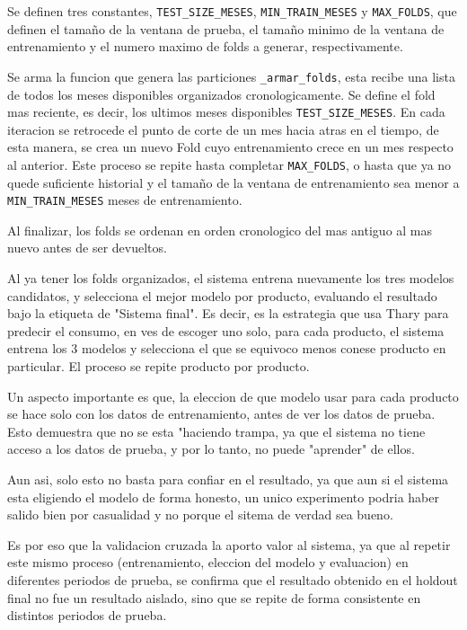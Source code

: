 Se definen tres constantes, \texttt{TEST\_SIZE\_MESES}, \texttt{MIN\_TRAIN\_MESES} y \texttt{MAX\_FOLDS}, que definen el tamaño de la ventana de prueba, el tamaño minimo de la ventana de entrenamiento y el numero maximo de folds a generar, respectivamente.


Se arma la funcion que genera las particiones \texttt{\_armar\_folds}, esta recibe una lista de todos los meses disponibles organizados cronologicamente. Se define el fold mas reciente, es decir, los ultimos meses disponibles \texttt{TEST\_SIZE\_MESES}. En cada iteracion se retrocede el punto de corte de un mes hacia atras en el tiempo, de esta manera, se crea un nuevo Fold cuyo entrenamiento crece en un mes respecto al anterior. Este proceso se repite hasta completar \texttt{MAX\_FOLDS}, o hasta que ya no quede suficiente historial y el tamaño de la ventana de entrenamiento sea menor a \texttt{MIN\_TRAIN\_MESES} meses de entrenamiento.  

Al finalizar, los folds se ordenan en orden cronologico del mas antiguo al mas nuevo antes de ser devueltos.

Al ya tener los folds organizados, el sistema entrena nuevamente los tres modelos candidatos, y selecciona el mejor modelo por producto, evaluando el resultado bajo la etiqueta de "Sistema final". Es decir, es la estrategia que usa Thary para predecir el consumo, en ves de escoger uno solo, para cada producto, el sistema entrena los 3 modelos y selecciona el que se equivoco menos conese producto en particular. El proceso se repite producto por producto.

Un aspecto importante es que, la eleccion de que modelo usar para cada producto se hace solo con los datos de entrenamiento, antes de ver los datos de prueba. Esto demuestra que no se esta "haciendo trampa, ya que el sistema no tiene acceso a los datos de prueba, y por lo tanto, no puede "aprender" de ellos.

Aun asi, solo esto no basta para confiar en el resultado, ya que aun si el sistema esta eligiendo el modelo de forma honesto, un unico experimento podria haber salido bien por casualidad y no porque el sitema de verdad sea bueno.


Es por eso que la validacion cruzada la aporto valor al sistema, ya que al repetir este mismo proceso (entrenamiento, eleccion del modelo y evaluacion) en diferentes periodos de prueba, se confirma que el resultado obtenido en el holdout final no fue un resultado aislado, sino que se repite de forma consistente en distintos periodos de prueba.


